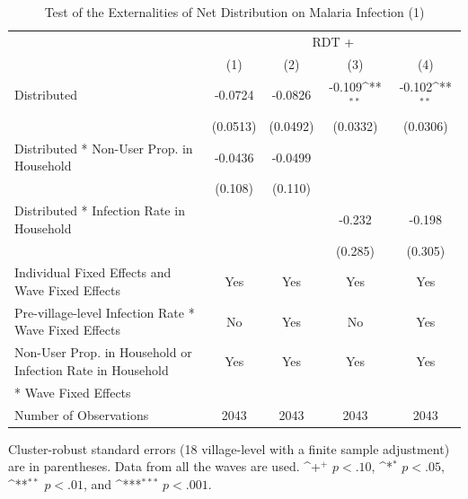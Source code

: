 \documentclass[fleqn,11pt]{article}
\newcommand{\sym}[1]{\rlap{$#1$}}
\def\sym#1{\ifmmode^{#1}\else\(^{#1}\)\fi
}
\begin{document}
\begin{table}[h]
\caption{Test of the Externalities of Net Distribution on Malaria Infection (1)}
\label{externality_child}
\centering
\begin{threeparttable}
\begin{tabular}{l*{4}{c}}
\hline\hline                     &\multicolumn{4}{c}{RDT +}\\  \cmidrule(lr){2-5} 
                    &\multicolumn{1}{c}{(1)}&\multicolumn{1}{c}{(2)}&\multicolumn{1}{c}{(3)}&\multicolumn{1}{c}{(4)}\\
\hline
Distributed         &     -0.0724         &     -0.0826         &      -0.109\sym{**} &      -0.102\sym{**} \\
                    &    (0.0513)         &    (0.0492)         &    (0.0332)         &    (0.0306)         \\

Distributed * {Non-User Prop. in Household} &     -0.0436         &     -0.0499         &                     &                     \\
                    &     (0.108)         &     (0.110)         &                     &                     \\
 
Distributed * {Infection Rate in Household} &               &                       &      -0.232         &      -0.198         \\
                    &                     &                     &     (0.285)         &     (0.305)         \\

Individual Fixed Effects and Wave Fixed Effects &         Yes         &         Yes         &         Yes         &         Yes         \\

Pre-village-level Infection Rate * Wave Fixed Effects&          No         &         Yes         &          No         &         Yes         \\

Non-User Prop. in Household or Infection Rate in Household&         Yes         &         Yes         &         Yes         &         Yes         \\ * Wave Fixed Effects&                  &                  &                  &                  \\
\hline
Number of Observations        &        2043         &        2043         &        2043         &        2043         \\
\hline\hline
\end{tabular}
\begin{tablenotes}
\item Cluster-robust standard errors (18 village-level with a finite sample adjustment) are in parentheses. Data from all the waves are used.  \sym{+} \(p<.10\), \sym{*} \(p<.05\), \sym{**} \(p<.01\), and \sym{***} \(p<.001\). 
\end{tablenotes}
\end{threeparttable}
\end{table}
\end{document}
